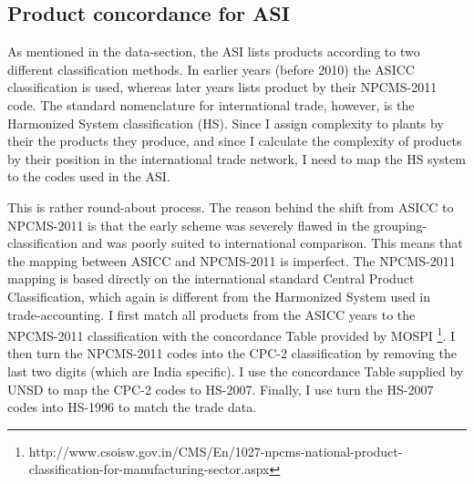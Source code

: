 \documentclass[11pt]{article}
\begin{document}
\begin{appendices}
\subsection{Product concordance for ASI}%
\label{sub:product_concordance_asi}

As mentioned in the data-section, the ASI lists products according to two different classification methods. In earlier years (before 2010) the ASICC classification is used, whereas later years lists product by their NPCMS-2011 code. The standard nomenclature for international trade, however, is the Harmonized System classification (HS). Since I assign complexity to plants by their the products they produce, and since I calculate the complexity of products by their position in the international trade network, I need to map the HS system to the codes used in the ASI.

This is rather round-about process. The reason behind the shift from ASICC to NPCMS-2011 is that the early scheme was severely flawed in the grouping-classification and was poorly suited to international comparison. This means that the mapping between ASICC and NPCMS-2011 is imperfect. The NPCMS-2011 mapping is based directly on the international standard Central Product Classification, which again is different from the Harmonized System used in trade-accounting. I first match all products from the ASICC years to the NPCMS-2011 classification with the concordance Table provided by MOSPI \footnote{http://www.csoisw.gov.in/CMS/En/1027-npcms-national-product-classification-for-manufacturing-sector.aspx}. I then turn the NPCMS-2011 codes into the CPC-2 classification by removing the last two digits (which are India specific). I use the concordance Table supplied by UNSD to map the CPC-2 codes to HS-2007. Finally, I use turn the HS-2007 codes into HS-1996 to match the trade data. 


\end{appendices}
\end{document}
